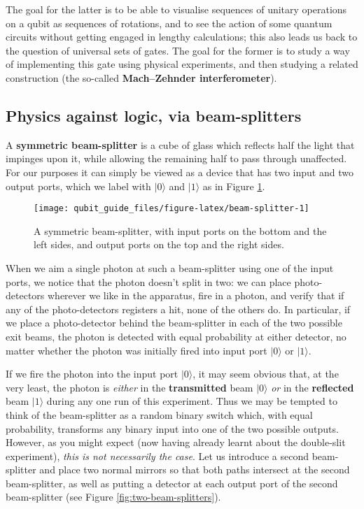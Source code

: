 \documentclass[fleqn]{article}
\begin{document}
The goal for the latter is to be able to visualise sequences of unitary operations on a qubit as sequences of rotations, and to see the action of some quantum circuits without getting engaged in lengthy calculations; this also leads us back to the question of universal sets of gates.
The goal for the former is to study a way of implementing this gate using physical experiments, and then studying a related construction (the so-called \textbf{Mach--Zehnder interferometer}).

\hypertarget{beamsplitters-against-logic}{%
\subsection{Physics against logic, via beam-splitters}\label{beamsplitters-against-logic}}

A \textbf{symmetric beam-splitter} is a cube of glass which reflects half the light that impinges upon it, while allowing the remaining half to pass through unaffected.
For our purposes it can simply be viewed as a device that has two input and two output ports, which we label with \(|0\rangle\) and \(|1\rangle\) as in Figure \ref{fig:beam-splitter}.

\begin{figure}[H]

{\centering \texttt{[image: qubit\_guide\_files/figure-latex/beam-splitter-1]} 

}

\caption{A symmetric beam-splitter, with input ports on the bottom and the left sides, and output ports on the top and the right sides.}\label{fig:beam-splitter}
\end{figure}

When we aim a single photon at such a beam-splitter using one of the input ports, we notice that the photon doesn't split in two: we can place photo-detectors wherever we like in the apparatus, fire in a photon, and verify that if any of the photo-detectors registers a hit, none of the others do.
In particular, if we place a photo-detector behind the beam-splitter in each of the two possible exit beams, the photon is detected with equal probability at either detector, no matter whether the photon was initially fired into input port \(|0\rangle\) or \(|1\rangle\).

If we fire the photon into the input port \(|0\rangle\), it may seem obvious that, at the very least, the photon is \emph{either} in the \textbf{transmitted} beam \(|0\rangle\) \emph{or} in the \textbf{reflected} beam \(|1\rangle\) during any one run of this experiment.
Thus we may be tempted to think of the beam-splitter as a random binary switch which, with equal probability, transforms any binary input into one of the two possible outputs.
However, as you might expect (now having already learnt about the double-slit experiment), \emph{this is not necessarily the case}.
Let us introduce a second beam-splitter and place two normal mirrors so that both paths intersect at the second beam-splitter, as well as putting a detector at each output port of the second beam-splitter (see Figure \ref{fig:two-beam-splitters}).
\end{document}
